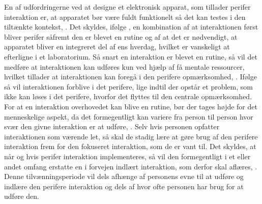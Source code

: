 En af udfordringerne ved at designe et elektronisk apparat, som tillader perifer interaktion er, at apparatet bør være fuldt funktionelt så det kan testes i den tiltænkte kontekst, \parencite[s. 21]{PDF:EvaluatingPI}. Det skyldes, ifølge \textcite[s. 22]{PDF:EvaluatingPI}, en kombination af at interaktionen først bliver perifer såfremt den er blevet en rutine og af at det er nødvendigt, at apparatet bliver en integreret del af ens hverdag, hvilket er vanskeligt at efterligne i et laboratorium. Så snart en interaktion er blevet en rutine, så vil det medføre at interaktionen kan udføres kun ved hjælp af få mentale ressourcer, hvilket tillader at interaktionen kan foregå i den perifere opmærksomhed, \parencite[s. 2]{PDF:FacilitatingPIDesignAndEvaluation}. Ifølge \textcite[s. 14]{PDF:PeripheralInteraction} så vil interaktionen forblive i det perifere, lige indtil der opstår et problem, som ikke kan løses i det perifere, hvorfor det flyttes til den centrale opmærksomhed. For at en interaktion overhovedet kan blive en rutine, bør der tages højde for det menneskelige aspekt, da det formegentligt kan variere fra person til person hvor svær den givne interaktion er at udføre, \parencite[s. 248]{PDF:PICharacteristicsAndConsiderations}. Selv hvis personen opfatter interaktionen som værende let, så skal de stadig lære at gøre brug af den perifere interaktion frem for den fokuseret interaktion, som de er vant til. Det skyldes, at når og hvis perifer interaktion implementeres, så vil den formegentligt i et eller andet omfang erstatte en i forvejen indlært interaktion, som derfor skal aflæres, \parencite[s. 248]{PDF:PICharacteristicsAndConsiderations}. Denne tilvænningsperiode vil dels afhænge af personens evne til at udføre og indlære den perifere interaktion og dels af hvor ofte personen har brug for at udføre den.\blankline 
%
